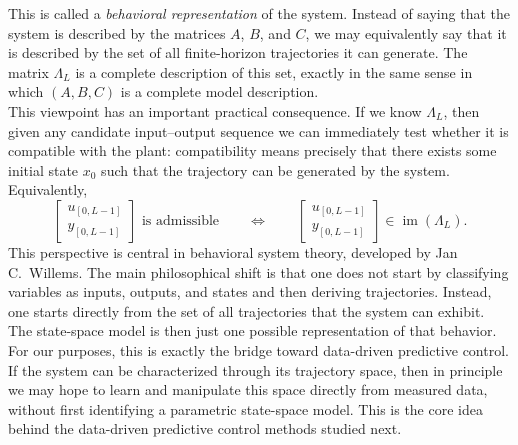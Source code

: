 This is called a \emph{behavioral representation} of the system. Instead of saying that the system is described by the matrices $A$, $B$, and $C$, we may equivalently say that it is described by the set of all finite-horizon trajectories it can generate. The matrix $\Lambda_L$ is a complete description of this set, exactly in the same sense in which $(A,B,C)$ is a complete model description.\\
This viewpoint has an important practical consequence. If we know $\Lambda_L$, then given any candidate input--output sequence we can immediately test whether it is compatible with the plant: compatibility means precisely that there exists some initial state $x_0$ such that the trajectory can be generated by the system. Equivalently,
\[
\begin{bmatrix}
u_{[0,L-1]}\\[1mm]
y_{[0,L-1]}
\end{bmatrix}
\text{ is admissible}
\qquad\Longleftrightarrow\qquad
\begin{bmatrix}
u_{[0,L-1]}\\[1mm]
y_{[0,L-1]}
\end{bmatrix}
\in \operatorname{im}(\Lambda_L).
\]
This perspective is central in behavioral system theory, developed by Jan C.\ Willems. The main philosophical shift is that one does not start by classifying variables as inputs, outputs, and states and then deriving trajectories. Instead, one starts directly from the set of all trajectories that the system can exhibit. The state-space model is then just one possible representation of that behavior.\\
For our purposes, this is exactly the bridge toward data-driven predictive control. If the system can be characterized through its trajectory space, then in principle we may hope to learn and manipulate this space directly from measured data, without first identifying a parametric state-space model. This is the core idea behind the data-driven predictive control methods studied next.\\


